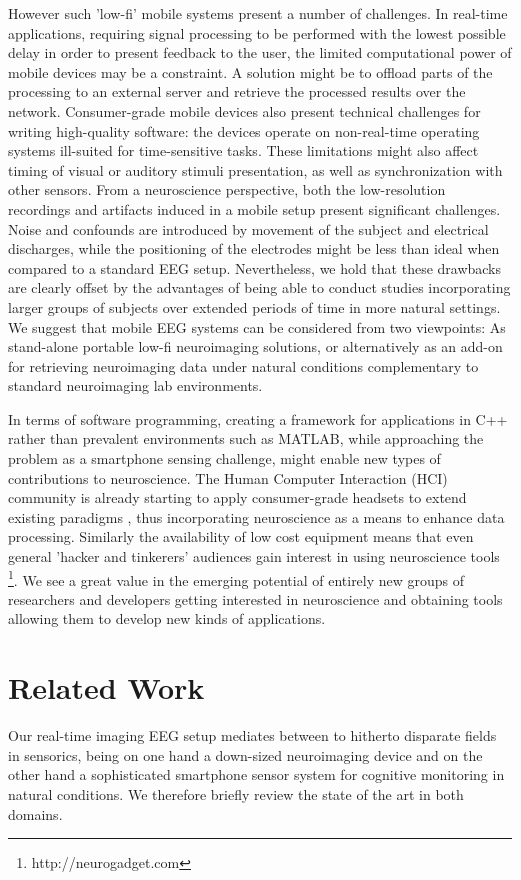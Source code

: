 \documentclass[10pt]{article}
\begin{document}
However such 'low-fi' mobile systems present a number of challenges. In real-time applications, requiring signal processing to be performed with the lowest possible delay in order to present feedback to the user, the limited computational power of mobile devices may be a constraint. A solution might  be to offload parts of the processing to an external server and retrieve the processed results over the network. Consumer-grade mobile devices also present technical challenges for writing high-quality software: the devices operate on non-real-time operating systems ill-suited for time-sensitive tasks. These limitations might also affect timing of visual or auditory stimuli presentation, as well as synchronization with other sensors. From a neuroscience perspective, both the low-resolution recordings and artifacts induced in a mobile setup present significant challenges. Noise and confounds are introduced by movement of the subject and electrical discharges, while the positioning of the electrodes might be less than ideal when compared to a standard EEG setup\cite{stahlhutevaluation,Chi2012:EEGSensorsMobileBCI}. Nevertheless, we hold that these drawbacks  are clearly offset by the advantages of being able to conduct studies incorporating larger groups of subjects over extended periods of time in more natural settings. We suggest that  mobile EEG systems can be considered from two viewpoints: As stand-alone portable low-fi neuroimaging solutions, or alternatively as an add-on for retrieving neuroimaging data under natural conditions complementary to standard neuroimaging lab environments. 

In terms of software programming, creating a framework for applications in C++ rather than prevalent environments such as MATLAB, while approaching the problem as a smartphone sensing challenge, might enable new types of contributions to neuroscience. The Human Computer Interaction (HCI) community is already starting to apply consumer-grade headsets  to extend existing paradigms \cite{vi2012detecting}, thus incorporating neuroscience as a means to enhance data processing. Similarly the availability of low cost equipment means that even  general 'hacker and tinkerers' audiences gain interest in using neuroscience tools \footnote{http://neurogadget.com}. We see a great value in the emerging potential of entirely new groups of researchers and developers getting interested in neuroscience and obtaining tools allowing them to develop new kinds of applications.  \section{Related Work}
Our real-time imaging EEG setup mediates between to hitherto disparate fields in sensorics, being on one hand a down-sized neuroimaging device and on the other hand a sophisticated smartphone sensor system for cognitive monitoring in natural conditions. We therefore briefly review the state of the art in both domains.
\end{document}
